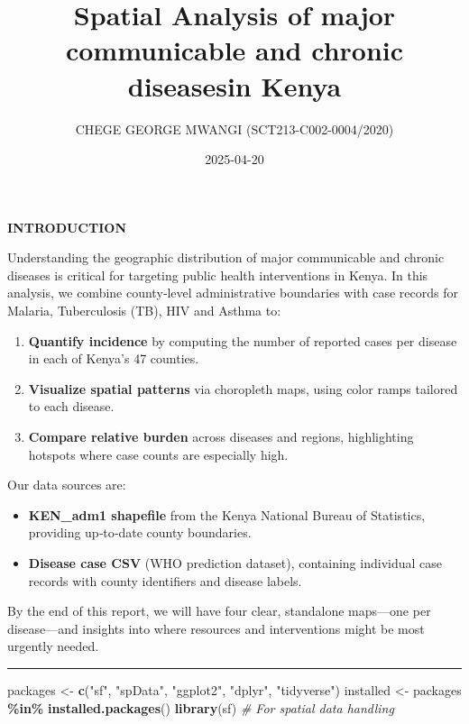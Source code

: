 \documentclass[
]{article}
\title{Spatial Analysis of major communicable and chronic diseasesin
Kenya}
\author{CHEGE GEORGE MWANGI (SCT213-C002-0004/2020)}
\date{2025-04-20}
\newenvironment{Shaded}{\begin{snugshade}}{\end{snugshade}}
\newcommand{\CommentTok}[1]{\textcolor[rgb]{0.56,0.35,0.01}{\textit{#1}}}
\newcommand{\FunctionTok}[1]{\textcolor[rgb]{0.13,0.29,0.53}{\textbf{#1}}}
\newcommand{\NormalTok}[1]{#1}
\newcommand{\OtherTok}[1]{\textcolor[rgb]{0.56,0.35,0.01}{#1}}
\newcommand{\SpecialCharTok}[1]{\textcolor[rgb]{0.81,0.36,0.00}{\textbf{#1}}}
\newcommand{\StringTok}[1]{\textcolor[rgb]{0.31,0.60,0.02}{#1}}
\providecommand{\tightlist}{%
  \setlength{\itemsep}{0pt}\setlength{\parskip}{0pt}}
\begin{document}
\maketitle

\textbf{INTRODUCTION}

Understanding the geographic distribution of major communicable and
chronic diseases is critical for targeting public health interventions
in Kenya. In this analysis, we combine county‑level administrative
boundaries with case records for Malaria, Tuberculosis (TB), HIV and
Asthma to:

\begin{enumerate}
\def\labelenumi{\arabic{enumi}.}
\tightlist
\item
  \textbf{Quantify incidence} by computing the number of reported cases
  per disease in each of Kenya's 47 counties.\\
\item
  \textbf{Visualize spatial patterns} via choropleth maps, using color
  ramps tailored to each disease.\\
\item
  \textbf{Compare relative burden} across diseases and regions,
  highlighting hotspots where case counts are especially high.
\end{enumerate}

Our data sources are:

\begin{itemize}
\tightlist
\item
  \textbf{KEN\_adm1 shapefile} from the Kenya National Bureau of
  Statistics, providing up‑to‑date county boundaries.\\
\item
  \textbf{Disease case CSV} (WHO prediction dataset), containing
  individual case records with county identifiers and disease labels.
\end{itemize}

By the end of this report, we will have four clear, standalone
maps---one per disease---and insights into where resources and
interventions might be most urgently needed.

\begin{center}\rule{0.5\linewidth}{0.5pt}\end{center}

\begin{Shaded}
\begin{Highlighting}[]
\NormalTok{packages }\OtherTok{\textless{}{-}} \FunctionTok{c}\NormalTok{(}\StringTok{"sf"}\NormalTok{, }\StringTok{"spData"}\NormalTok{, }\StringTok{"ggplot2"}\NormalTok{, }\StringTok{"dplyr"}\NormalTok{, }\StringTok{"tidyverse"}\NormalTok{)}
\NormalTok{installed }\OtherTok{\textless{}{-}}\NormalTok{ packages }\SpecialCharTok{\%in\%} \FunctionTok{installed.packages}\NormalTok{()}
\FunctionTok{library}\NormalTok{(sf)          }\CommentTok{\# For spatial data handling}
\end{Highlighting}
\end{Shaded}
\end{document}
